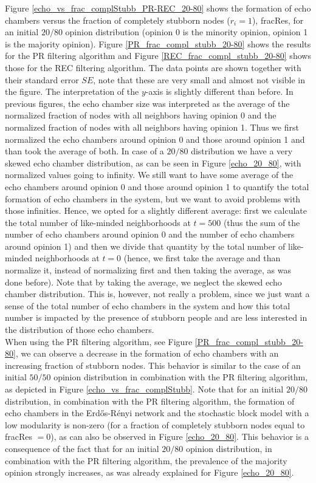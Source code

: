 \documentclass[11 pt , letterpaper , twoside , openright]{book}
\begin{document}
Figure \ref{echo_vs_frac_complStubb_PR-REC_20-80} shows the formation of echo chambers versus the fraction of completely stubborn nodes ($r_i = 1$), fracRes, for an initial $20/80$ opinion distribution (opinion 0 is the minority opinion, opinion 1 is the majority opinion). Figure \ref{PR_frac_compl_stubb_20-80} shows the results for the PR filtering algorithm and Figure \ref{REC_frac_compl_stubb_20-80} shows those for the REC filtering algorithm. The data points are shown together with their standard error $SE$, note that these are very small and almost not visible in the figure. The interpretation of the $y$-axis is slightly different than before. In previous figures, the echo chamber size was interpreted as the average of the normalized fraction of nodes with all neighbors having opinion 0 and the normalized fraction of nodes with all neighbors having opinion 1. Thus we first normalized the echo chambers around opinion 0 and those around opinion 1 and than took the average of both. In case of a $20/80$ distribution we have a very skewed echo chamber distribution, as can be seen in Figure \ref{echo_20_80}, with normalized values going to infinity. We still want to have some average of the echo chambers around opinion 0 and those around opinion 1 to quantify the total formation of echo chambers in the system, but we want to avoid problems with those infinities. Hence, we opted for a slightly different average: first we calculate the total number of like-minded neighborhoods at $t=500$ (thus the sum of the number of echo chambers around opinion 0 and the number of echo chambers around opinion 1) and then we divide that quantity by the total number of like-minded neighborhoods at $t=0$ (hence, we first take the average and than normalize it, instead of normalizing first and then taking the average, as was done before). Note that by taking the average, we neglect the skewed echo chamber distribution. This is, however, not really a problem, since we just want a sense of the total number of echo chambers in the system and how this total number is impacted by the presence of stubborn people and are less interested in the distribution of those echo chambers. \\
\newline
When using the PR filtering algorithm, see Figure \ref{PR_frac_compl_stubb_20-80}, we can observe a decrease in the formation of echo chambers with an increasing fraction of stubborn nodes. This behavior is similar to the case of an initial $50/50$ opinion distribution in combination with the PR filtering algorithm, as depicted in Figure \ref{echo_vs_frac_complStubb}. Note that for an initial $20/80$ distribution, in combination with the PR filtering algorithm, the formation of echo chambers in the Erd\H{o}s-R\'{e}nyi network and the stochastic block model with a low modularity is non-zero (for a fraction of completely stubborn nodes equal to fracRes $=0$), as can also be observed in Figure \ref{echo_20_80}. This behavior is a consequence of the fact that for an initial $20/80$ opinion distribution, in combination with the PR filtering algorithm, the prevalence of the majority opinion strongly increases, as was already explained for Figure \ref{echo_20_80}. \\
\end{document}
